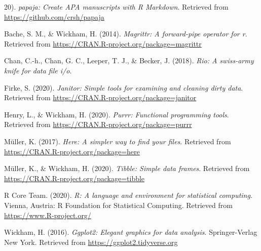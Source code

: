 \documentclass[
  english,
  man]{apa6}
\begin{document}
20). \emph{papaja: Create APA manuscripts with R Markdown}. Retrieved from \url{https://github.com/crsh/papaja}

\leavevmode\hypertarget{ref-R-magrittr}{}%
Bache, S. M., \& Wickham, H. (2014). \emph{Magrittr: A forward-pipe operator for r}. Retrieved from \url{https://CRAN.R-project.org/package=magrittr}

\leavevmode\hypertarget{ref-R-rio}{}%
Chan, C.-h., Chan, G. C., Leeper, T. J., \& Becker, J. (2018). \emph{Rio: A swiss-army knife for data file i/o}.

\leavevmode\hypertarget{ref-R-janitor}{}%
Firke, S. (2020). \emph{Janitor: Simple tools for examining and cleaning dirty data}. Retrieved from \url{https://CRAN.R-project.org/package=janitor}

\leavevmode\hypertarget{ref-R-purrr}{}%
Henry, L., \& Wickham, H. (2020). \emph{Purrr: Functional programming tools}. Retrieved from \url{https://CRAN.R-project.org/package=purrr}

\leavevmode\hypertarget{ref-R-here}{}%
Müller, K. (2017). \emph{Here: A simpler way to find your files}. Retrieved from \url{https://CRAN.R-project.org/package=here}

\leavevmode\hypertarget{ref-R-tibble}{}%
Müller, K., \& Wickham, H. (2020). \emph{Tibble: Simple data frames}. Retrieved from \url{https://CRAN.R-project.org/package=tibble}

\leavevmode\hypertarget{ref-R-base}{}%
R Core Team. (2020). \emph{R: A language and environment for statistical computing}. Vienna, Austria: R Foundation for Statistical Computing. Retrieved from \url{https://www.R-project.org/}

\leavevmode\hypertarget{ref-R-ggplot2}{}%
Wickham, H. (2016). \emph{Ggplot2: Elegant graphics for data analysis}. Springer-Verlag New York. Retrieved from \url{https://ggplot2.tidyverse.org}
\end{document}
